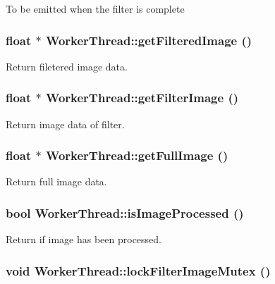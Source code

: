 To be emitted when the filter is complete \hypertarget{classWorkerThread_57da1f3c04f0e9972e9091783ea95d32}{
\subsubsection[{getFilteredImage}]{\setlength{\rightskip}{0pt plus 5cm}float $\ast$ WorkerThread::getFilteredImage ()}}
\label{classWorkerThread_57da1f3c04f0e9972e9091783ea95d32}


Return filetered image data. \hypertarget{classWorkerThread_03d82e87ce2cc58dad74a00e512815fb}{
\subsubsection[{getFilterImage}]{\setlength{\rightskip}{0pt plus 5cm}float $\ast$ WorkerThread::getFilterImage ()}}
\label{classWorkerThread_03d82e87ce2cc58dad74a00e512815fb}


Return image data of filter. \hypertarget{classWorkerThread_bfa352a6f31a5b62a92d5c4cebbece96}{
\subsubsection[{getFullImage}]{\setlength{\rightskip}{0pt plus 5cm}float $\ast$ WorkerThread::getFullImage ()}}
\label{classWorkerThread_bfa352a6f31a5b62a92d5c4cebbece96}


Return full image data. \hypertarget{classWorkerThread_f33b6a6ada1af97648571411e2eb10d4}{
\subsubsection[{isImageProcessed}]{\setlength{\rightskip}{0pt plus 5cm}bool WorkerThread::isImageProcessed ()}}
\label{classWorkerThread_f33b6a6ada1af97648571411e2eb10d4}


Return if image has been processed. \hypertarget{classWorkerThread_9fa421c0e788a4e6e4e2bc5933aa7326}{
\subsubsection[{lockFilterImageMutex}]{\setlength{\rightskip}{0pt plus 5cm}void WorkerThread::lockFilterImageMutex ()}}
\label{classWorkerThread_9fa421c0e788a4e6e4e2bc5933aa7326}


